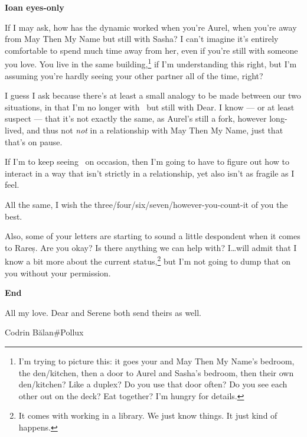 \textbf{Ioan eyes-only}

If I may ask, how has the dynamic worked when you're Aurel, when you're away from May Then My Name but still with Sasha? I can't imagine it's entirely comfortable to spend much time away from her, even if you're still with someone you love. You live in the same building,\footnote{I'm trying to picture this: it goes your and May Then My Name's bedroom, the den/kitchen, then a door to Aurel and Sasha's bedroom, then their own den/kitchen? Like a duplex? Do you use that door often? Do you see each other out on the deck? Eat together? I'm hungry for details.} if I'm understanding this right, but I'm assuming you're hardly seeing your other partner all of the time, right?

I guess I ask because there's at least a small analogy to be made between our two situations, in that I'm no longer with \Partner\ but still with Dear. I know — or at least suspect — that it's not exactly the same, as Aurel's still a fork, however long-lived, and thus not \emph{not} in a relationship with May Then My Name, just that that's on pause.

If I'm to keep seeing \Partner\ on occasion, then I'm going to have to figure out how to interact in a way that isn't strictly in a relationship, yet also isn't as fragile as I feel.

All the same, I wish the three/four/six/seven/however-you-count-it of you the best.

Also, some of your letters are starting to sound a little despondent when it comes to Rareș. Are you okay? Is there anything we can help with? I\ldots will admit that I know a bit more about the current status,\footnote{It comes with working in a library. We just know things. It just kind of happens.} but I'm not going to dump that on you without your permission.

\textbf{End}

All my love. Dear and Serene both send theirs as well.

Codrin Bălan\#Pollux
